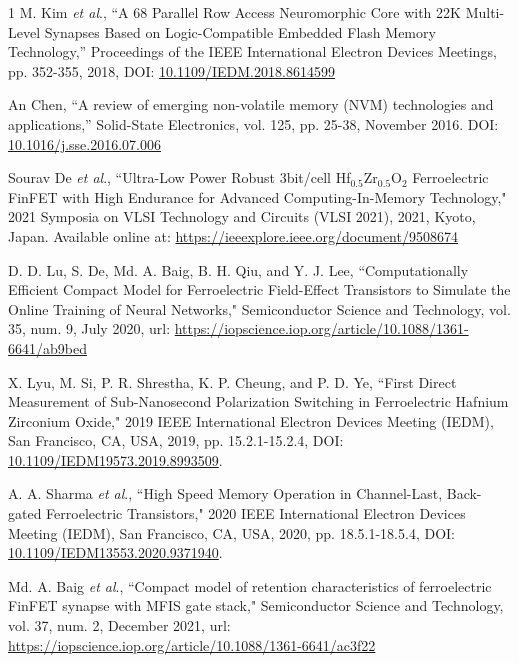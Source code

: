 \documentclass[journal]{IEEEtran}
\begin{document}
\begin{thebibliography}{1}
M. Kim \emph{et al}., ``A 68 Parallel Row Access Neuromorphic Core with 22{K} Multi-Level Synapses Based on Logic-Compatible Embedded Flash Memory Technology,” Proceedings of the IEEE International Electron Devices Meetings, pp. 352-355, 2018, DOI: \href{https://ieeexplore.ieee.org/document/8614599}{10.1109/IEDM.2018.8614599}


An Chen, ``A review of emerging non-volatile memory (NVM) technologies and applications,” Solid-State Electronics, vol. 125, pp. 25-38, November 2016. DOI: \href{https://doi.org/10.1016/j.sse.2016.07.006}{10.1016/j.sse.2016.07.006}

Sourav De \emph{et al}., ``Ultra-Low Power Robust 3bit/cell Hf$_{0.5}$Zr$_{0.5}$O$_2$ Ferroelectric FinFET with High Endurance for Advanced Computing-In-Memory Technology," 2021 Symposia on VLSI Technology and Circuits (VLSI 2021), 2021, Kyoto, Japan. Available online at: \href{https://ieeexplore.ieee.org/document/9508674}{https://ieeexplore.ieee.org/document/9508674}

D. D. Lu, S. De, Md. A. Baig, B. H. Qiu, and Y. J. Lee, ``Computationally Efficient Compact Model for Ferroelectric Field-Effect Transistors to Simulate the Online Training of Neural Networks," Semiconductor Science and Technology, vol. 35, num. 9, July 2020, url: \href{https://iopscience.iop.org/article/10.1088/1361-6641/ab9bed}{https://iopscience.iop.org/article/10.1088/1361-6641/ab9bed}

X. Lyu, M. Si, P. R. Shrestha, K. P. Cheung, and P. D. Ye, ``First Direct Measurement of Sub-Nanosecond Polarization Switching in Ferroelectric Hafnium Zirconium Oxide," 2019 IEEE International Electron Devices Meeting (IEDM), San Francisco, CA, USA, 2019, pp. 15.2.1-15.2.4, DOI: \href{https://ieeexplore.ieee.org/document/8993509}{10.1109/IEDM19573.2019.8993509}.

A. A. Sharma \emph{et al}., ``High Speed Memory Operation in Channel-Last, Back-gated Ferroelectric Transistors," 2020 IEEE International Electron Devices Meeting (IEDM), San Francisco, CA, USA, 2020, pp. 18.5.1-18.5.4, DOI: \href{https://ieeexplore.ieee.org/document/9371940}{10.1109/IEDM13553.2020.9371940}.

Md. A. Baig \emph{et al}., ``Compact model of retention characteristics of ferroelectric FinFET synapse with MFIS gate stack," Semiconductor Science and Technology, vol. 37, num. 2, December 2021, url: \href{https://iopscience.iop.org/article/10.1088/1361-6641/ac3f22}{https://iopscience.iop.org/article/10.1088/1361-6641/ac3f22}


\end{thebibliography}
\end{document}

